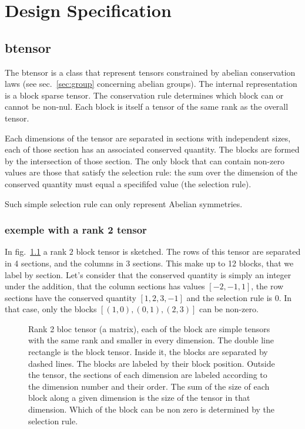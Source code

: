 \documentclass[15pt]{book}
\begin{document}
\chapter{Design Specification}
\section{btensor}
The btensor is a class that represent tensors constrained by abelian conservation laws (see sec.~\ref{sec:group} concerning abelian groups).
The internal representation is a block sparse tensor.
The conservation rule determines which block can or cannot be non-nul.
Each block is itself a tensor of the same rank as the overall tensor.

Each dimensions of the tensor are separated in sections with independent sizes, each of those section
has an associated conserved quantity. The blocks are formed by the intersection of those section.
The only block that can contain non-zero values are those that satisfy the selection rule: the sum over the
dimension of the conserved quantity must equal a specififed value (the selection rule).

Such simple selection rule can only represent Abelian symmetries.

\subsection{exemple with a rank 2 tensor}
\FloatBarrier
In fig.~\ref{fig:blockmat} a rank $2$ block tensor is sketched. The rows of this tensor are separated in 4 sections, and the columns in 3 sections.
This make up to 12 blocks, that we label by section.
Let's consider that the conserved quantity is simply an integer under the addition, that the column sections has values $[-2,-1,1]$, the row sections have the conserved quantity $[1,2,3,-1]$ and the selection rule is $0$. In that case, only the blocks $[(1,0),(0,1),(2,3)]$ can be non-zero.
\begin{figure}[h]
    \centering
    \def\svgwidth{0.75\textwidth}
    
    \caption{ Rank 2 bloc tensor (a matrix), each of the block are simple tensors with the same rank and smaller in every dimension. The double line rectangle is the block tensor. Inside it, the blocks are separated by dashed lines. The blocks are labeled by their block position. Outside the tensor, the sections of each dimension are labeled according to the dimension number and their order. The sum of the size of each block along a given dimension is the size of the tensor in that dimension. Which of the block can be non zero is determined by the selection rule.}\label{fig:blockmat}
\end{figure}
\end{document}
